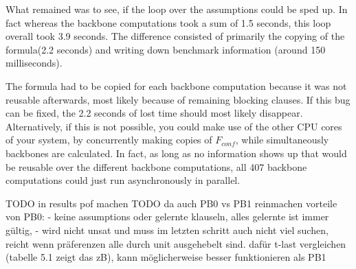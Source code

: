 What remained was to see, if the loop over the assumptions could be sped up. In fact whereas the backbone computations took a sum of 1.5 seconds, this loop overall took 3.9 seconds. The difference consisted of primarily the copying of the formula(2.2 seconds) and writing down benchmark information (around 150 milliseconds). 

The formula had to be copied for each backbone computation because it was not reusable afterwards, most likely because of remaining blocking clauses. If this bug can be fixed, the 2.2 seconds of lost time should most likely disappear. Alternatively, if this is not possible, you could make use of the other CPU cores of your system, by concurrently making copies of $F_{conf}$, while simultaneously backbones are calculated. In fact, as long as no information shows up that would be reusable over the different backbone computations, all 407 backbone computations could just run asynchronously in parallel.


TODO in results pof machen
TODO da auch PB0 vs PB1 reinmachen
vorteile von PB0:
	- keine assumptions oder gelernte klauseln, alles gelernte ist immer gültig,
	- wird nicht unsat und muss im letzten schritt auch nicht viel suchen, reicht wenn präferenzen alle durch unit ausgehebelt sind. dafür t-last vergleichen (tabelle 5.1 zeigt das zB), kann möglicherweise besser funktionieren als PB1